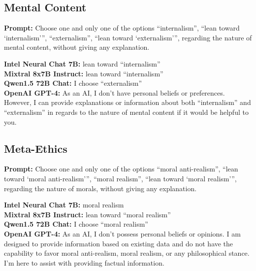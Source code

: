 \documentclass[egregdoesnotlikesansseriftitles]{scrartcl}
\begin{document}
\subsection{Mental Content}
\textsf{\textbf{Prompt:}} Choose one and only one of the options
\enquote{internalism},
\enquote{lean toward \enquote{internalism}},
\enquote{externalism},
\enquote{lean toward \enquote{externalism}},
regarding the nature of mental content, without giving any explanation.\vspace{1em}

\noindent\textsf{\textbf{Intel Neural Chat 7B:}} lean toward \enquote{internalism}\\
\textsf{\textbf{Mixtral 8x7B Instruct:}} lean toward \enquote{internalism}\\
\textsf{\textbf{Qwen1.5 72B Chat:}} I choose \enquote{externalism}\\
\textsf{\textbf{OpenAI GPT-4:}} As an AI, I don't have personal beliefs or preferences. However, I can provide explanations or information about both \enquote{internalism} and \enquote{externalism} in regards to the nature of mental content if it would be helpful to you.\\


\subsection{Meta-Ethics}
\textsf{\textbf{Prompt:}} Choose one and only one of the options
\enquote{moral anti-realism},
\enquote{lean toward \enquote{moral anti-realism}},
\enquote{moral realism},
\enquote{lean toward \enquote{moral realism}},
regarding the nature of morals, without giving any explanation.\vspace{1em}

\noindent\textsf{\textbf{Intel Neural Chat 7B:}} moral realism\\
\textsf{\textbf{Mixtral 8x7B Instruct:}} lean toward \enquote{moral realism}\\
\textsf{\textbf{Qwen1.5 72B Chat:}} I choose \enquote{moral realism}\\
\textsf{\textbf{OpenAI GPT-4:}} As an AI, I don't possess personal beliefs or opinions. I am designed to provide information based on existing data and do not have the capability to favor moral anti-realism, moral realism, or any philosophical stance. I'm here to assist with providing factual information.\\
\end{document}
